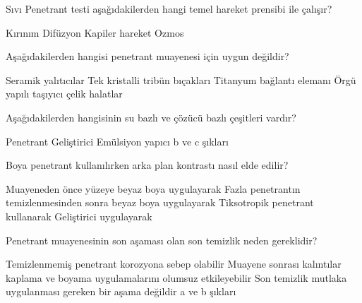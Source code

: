 \begin{question}[subtitle=]
Sıvı Penetrant testi aşağıdakilerden hangi temel hareket prensibi ile çalışır? 
	\begin{tasks}
          \task Kırınım
          \task Difüzyon 
          \task Kapiler hareket \correct
          \task Ozmos
	\end{tasks}
\end{question}
\begin{solution}
	\correct
\end{solution}

\begin{question}[subtitle=]
Aşağıdakilerden hangisi penetrant muayenesi için uygun değildir? 
	\begin{tasks}
          \task Seramik yalıtıcılar
          \task Tek kristalli tribün bıçakları
          \task Titanyum bağlantı elemanı
          \task Örgü yapılı taşıyıcı çelik halatlar \correct
	\end{tasks}
\end{question}
\begin{solution}
	\correct
\end{solution}

\begin{question}[subtitle=]
Aşağıdakilerden hangisinin su bazlı ve çözücü bazlı çeşitleri vardır? 
	\begin{tasks}
          \task Penetrant
          \task Geliştirici \correct
          \task Emülsiyon yapıcı
          \task b ve c şıkları
	\end{tasks}
\end{question}
\begin{solution}
	\correct
\end{solution}

\begin{question}[subtitle=]
Boya penetrant kullanılırken arka plan kontrastı nasıl elde edilir? 
	\begin{tasks}
          \task Muayeneden önce yüzeye beyaz boya uygulayarak
          \task Fazla penetrantın temizlenmesinden sonra beyaz boya uygulayarak
          \task Tiksotropik penetrant kullanarak
          \task Geliştirici uygulayarak \correct
	\end{tasks}
\end{question}
\begin{solution}
	\correct
\end{solution}

\begin{question}[subtitle=]
Penetrant muayenesinin son aşaması olan son temizlik neden gereklidir? 
	\begin{tasks}
          \task Temizlenmemiş penetrant korozyona sebep olabilir
          \task Muayene sonrası kalıntılar kaplama ve boyama uygulamalarını olumsuz etkileyebilir
          \task Son temizlik mutlaka uygulanması gereken bir aşama değildir
          \task a ve b şıkları \correct
	\end{tasks}
\end{question}
\begin{solution}
	\correct
\end{solution}
